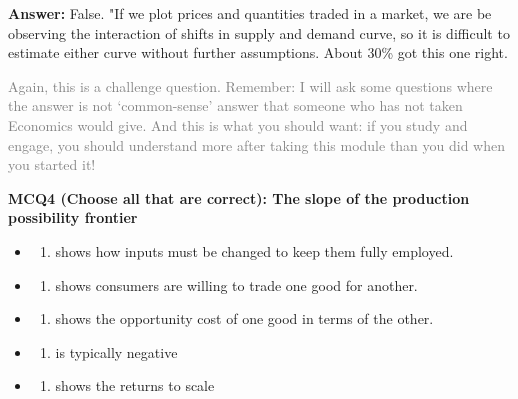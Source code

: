 \documentclass[]{article}
\providecommand{\tightlist}{%
  \setlength{\itemsep}{0pt}\setlength{\parskip}{0pt}}
\begin{document}
\textbf{Answer:} False. "If we plot prices and quantities traded in a
market, we are be observing the interaction of shifts in supply and
demand curve, so it is difficult to estimate either curve without
further assumptions. About 30\% got this one right.

\textcolor{gray}{Again, this is a challenge question. Remember: I will ask some questions where the answer is not ‘common-sense’ answer that someone who has not taken Economics would give. And this is what you should want: if you study and engage, you should understand more after taking this module than you did when you started it!}

\bigskip

\textbf{MCQ4 (Choose all that are correct): The slope of the production
possibility frontier}

\begin{itemize}
\item
  \begin{enumerate}
  \def\labelenumi{\alph{enumi}.}
  \tightlist
  \item
    shows how inputs must be changed to keep them fully employed.
  \end{enumerate}
\item
  \begin{enumerate}
  \def\labelenumi{\alph{enumi}.}
  \setcounter{enumi}{1}
  \tightlist
  \item
    shows consumers are willing to trade one good for another.
  \end{enumerate}
\item
  \begin{enumerate}
  \def\labelenumi{\alph{enumi}.}
  \setcounter{enumi}{2}
  \tightlist
  \item
    shows the opportunity cost of one good in terms of the other.
  \end{enumerate}
\item
  \begin{enumerate}
  \def\labelenumi{\alph{enumi}.}
  \setcounter{enumi}{3}
  \tightlist
  \item
    is typically negative
  \end{enumerate}
\item
  \begin{enumerate}
  \def\labelenumi{\alph{enumi}.}
  \setcounter{enumi}{4}
  \tightlist
  \item
    shows the returns to scale
  \end{enumerate}
\end{itemize}
\end{document}
